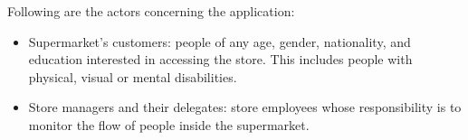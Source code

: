 \documentclass[../../main.tex]{subfiles}
\begin{document}
	Following are the actors concerning the application:
	\begin{itemize}
		\item Supermarket's customers: people of any age, gender, nationality, and education interested in accessing the store. This includes people with physical, visual or mental disabilities.
		\item Store managers and their delegates: store employees whose responsibility is to monitor the flow of people inside the supermarket.
	\end{itemize}
\end{document}
